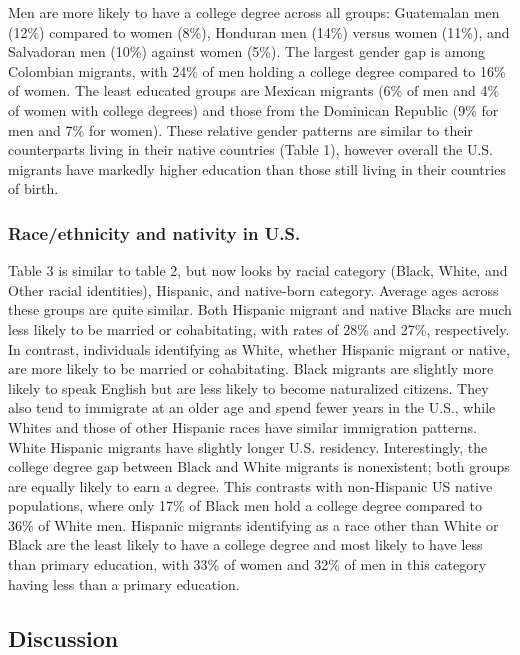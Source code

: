 \documentclass[
]{article}
\begin{document}
Men are more likely to have a college degree across all groups:
Guatemalan men (12\%) compared to women (8\%), Honduran men (14\%)
versus women (11\%), and Salvadoran men (10\%) against women (5\%). The
largest gender gap is among Colombian migrants, with 24\% of men holding
a college degree compared to 16\% of women. The least educated groups
are Mexican migrants (6\% of men and 4\% of women with college degrees)
and those from the Dominican Republic (9\% for men and 7\% for women).
These relative gender patterns are similar to their counterparts living
in their native countries (Table 1), however overall the U.S. migrants
have markedly higher education than those still living in their
countries of birth.

\subsubsection{Race/ethnicity and nativity in
U.S.}\label{raceethnicity-and-nativity-in-u.s.}

Table 3 is similar to table 2, but now looks by racial category (Black,
White, and Other racial identities), Hispanic, and native-born category.
Average ages across these groups are quite similar. Both Hispanic
migrant and native Blacks are much less likely to be married or
cohabitating, with rates of 28\% and 27\%, respectively. In contrast,
individuals identifying as White, whether Hispanic migrant or native,
are more likely to be married or cohabitating. Black migrants are
slightly more likely to speak English but are less likely to become
naturalized citizens. They also tend to immigrate at an older age and
spend fewer years in the U.S., while Whites and those of other Hispanic
races have similar immigration patterns. White Hispanic migrants have
slightly longer U.S. residency. Interestingly, the college degree gap
between Black and White migrants is nonexistent; both groups are equally
likely to earn a degree. This contrasts with non-Hispanic US native
populations, where only 17\% of Black men hold a college degree compared
to 36\% of White men. Hispanic migrants identifying as a race other than
White or Black are the least likely to have a college degree and most
likely to have less than primary education, with 33\% of women and 32\%
of men in this category having less than a primary education.

\subsection{Discussion}\label{sec-discussion}
\end{document}

